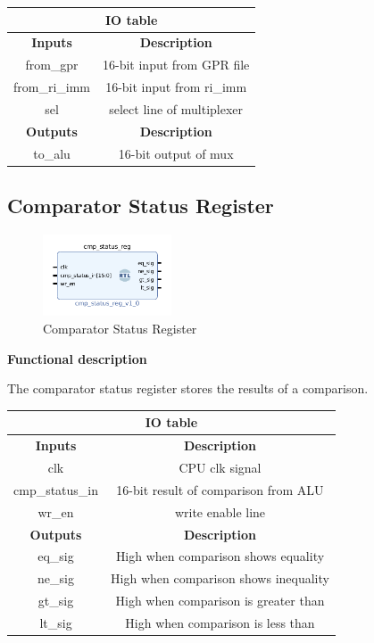 \documentclass{article}
\begin{document}
\begin{par}
	\begin{center}
		\begin{tabular}{|c|c|}
			\hline 
			\multicolumn{2}{|c|}{\textbf{IO table}} \\
			\hline 
			\textbf{Inputs} & \textbf{Description} \\ 
			\hline 
			from\_gpr & 16-bit input from GPR file \\ 
			\hline 
			from\_ri\_imm & 16-bit input from ri\_imm \\ 
			\hline 
			sel & select line of multiplexer \\ 
			\hline 
			\textbf{Outputs} & \textbf{Description} \\ 
			\hline 
			to\_alu & 16-bit output of mux \\
			\hline
		\end{tabular} 
	\end{center}

	\subsection{Comparator Status Register}
	
	\begin{figure}[H]
		\centering
		\includegraphics[width=1.5in]{img/cmpStat.png}
		\caption{Comparator Status Register}
	\end{figure}
	
	\textbf{Functional description}
	\begin{par}
		The comparator status register stores the results of a comparison. 
	\end{par}
	
	\begin{center}
		\begin{tabular}{|c|c|}
			\hline 
			\multicolumn{2}{|c|}{\textbf{IO table}} \\
			\hline 
			\textbf{Inputs} & \textbf{Description} \\ 
			\hline 
			clk & CPU clk signal \\ 
			\hline 
			cmp\_status\_in & 16-bit result of comparison from ALU \\ 
			\hline 
			wr\_en & write enable line \\ 
			\hline 
			\textbf{Outputs} & \textbf{Description} \\ 
			\hline 
			eq\_sig & High when comparison shows equality \\
			\hline
			ne\_sig & High when comparison shows inequality \\
			\hline
			gt\_sig & High when comparison is greater than \\
			\hline
			lt\_sig & High when comparison is less than \\
			\hline
		\end{tabular} 
	\end{center}
	

\end{par}
\end{document}

